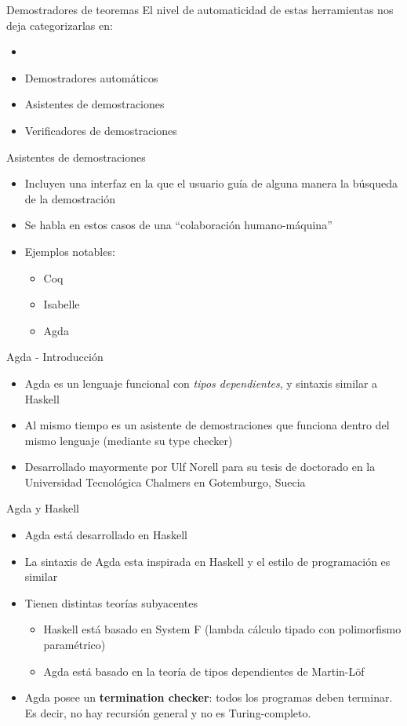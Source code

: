\documentclass[11pt]{beamer}
\newcommand{\bit}{\begin{itemize}\setlength\itemsep{1em}}
\newcommand{\biti}{\begin{itemize}\setlength\itemsep{0.3em}}
\newcommand{\eit}{\end{itemize}}
\begin{document}
\begin{frame}{Demostradores de teoremas}
El nivel de automaticidad de estas herramientas nos deja categorizarlas en:

\bit
\item[]
\item Demostradores automáticos
\item Asistentes de demostraciones
\item Verificadores de demostraciones
\eit
\end{frame}

\begin{frame}{Asistentes de demostraciones}
\bit
\setlength\itemsep{1em}
\item Incluyen una interfaz en la que el usuario guía de alguna manera la búsqueda de la demostración
\item Se habla en estos casos de una ``colaboración humano-máquina''
\item Ejemplos notables:
\biti
\item Coq
\item Isabelle
\item Agda 
\eit
\eit
\end{frame}

\begin{frame}{Agda - Introducción}
\bit
\item Agda es un lenguaje funcional con \textit{tipos dependientes}, y sintaxis similar a Haskell
\item Al mismo tiempo es un asistente de demostraciones que funciona dentro del mismo lenguaje (mediante su type checker)
\item Desarrollado mayormente por Ulf Norell para su tesis de doctorado en la Universidad Tecnológica Chalmers en Gotemburgo, Suecia
\eit
\end{frame}

\begin{frame}{Agda y Haskell}
\bit
\item Agda está desarrollado en Haskell
\item La sintaxis de Agda esta inspirada en Haskell y el estilo de programación es similar
\item Tienen distintas teorías subyacentes
\biti
\item Haskell está basado en System F (lambda cálculo tipado con polimorfismo paramétrico)
\item Agda está basado en la teoría de tipos dependientes de Martin-Löf
\eit
\item Agda posee un \textbf{termination checker}: todos los programas deben terminar. Es decir, no hay recursión general y no es Turing-completo.  
\eit
\end{frame}
\end{document}
